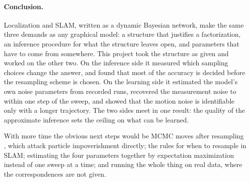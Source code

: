 \paragraph{Conclusion.} Localization and SLAM, written as a dynamic Bayesian network, make the same three demands
as any graphical model: a structure that justifies a factorization, an inference procedure for what the structure
leaves open, and parameters that have to come from somewhere. This project took the structure as given and worked
on the other two. On the inference side it measured which sampling choices change the answer, and found that most
of the accuracy is decided before the resampling scheme is chosen. On the learning side it estimated the model's
own noise parameters from recorded runs, recovered the measurement noise to within one step of the sweep, and
showed that the motion noise is identifiable only with a longer trajectory. The two sides meet in one result: the
quality of the approximate inference sets the ceiling on what can be learned.

With more time the obvious next steps would be MCMC moves after resampling \cite{gilks2001following}, which
attack particle impoverishment directly; the rules for when to resample in SLAM; estimating the four parameters
together by expectation maximization instead of one sweep at a time; and running the whole thing on real data,
where the correspondences are not given.
